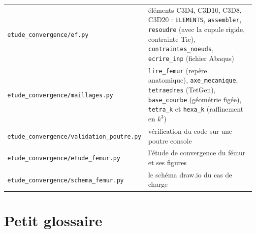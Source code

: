 \documentclass[11pt,a4paper]{article}
\newcommand{\fichier}[1]{\texttt{\small #1}}
\begin{document}
\begin{longtable}{p{4.2cm}p{11cm}}
\fichier{etude\_convergence/ef.py} & éléments C3D4, C3D10, C3D8, C3D20 : \texttt{ELEMENTS}, \texttt{assembler},
\texttt{resoudre} (avec la cupule rigide, contrainte Tie), \texttt{contraintes\_noeuds}, \texttt{ecrire\_inp}
(fichier Abaqus) \\
\fichier{etude\_convergence/maillages.py} & \texttt{lire\_femur} (repère anatomique), \texttt{axe\_mecanique},
\texttt{tetraedres} (TetGen), \texttt{base\_courbe} (géométrie figée), \texttt{tetra\_k} et \texttt{hexa\_k}
(raffinement en $k^3$) \\
\fichier{etude\_convergence/validation\_poutre.py} & vérification du code sur une poutre console \\
\fichier{etude\_convergence/etude\_femur.py} & l'étude de convergence du fémur et ses figures \\
\fichier{etude\_convergence/schema\_femur.py} & le schéma draw.io du cas de charge \\
\bottomrule
\end{longtable}

\section{Petit glossaire}
\end{document}
